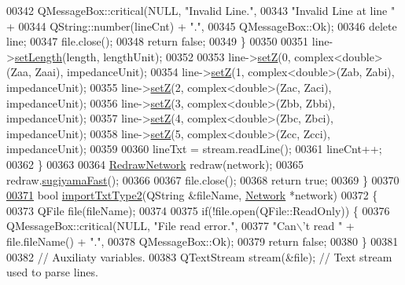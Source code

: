 \begin{DoxyCode}
00342       QMessageBox::critical(NULL, \textcolor{stringliteral}{"Invalid Line."},
00343                             \textcolor{stringliteral}{"Invalid Line at line "} +
00344                             QString::number(lineCnt) + \textcolor{stringliteral}{"."},
00345                             QMessageBox::Ok);
00346       \textcolor{keyword}{delete} line;
00347       file.close();
00348       \textcolor{keywordflow}{return} \textcolor{keyword}{false};
00349     \}
00350 
00351     line->\hyperlink{group___models_ga950d0b8f5d167eda430c65ca7adadbb0}{setLength}(length, lengthUnit);
00352 
00353     line->\hyperlink{group___models_ga2b8fe47ae4ae2d4422d9431e17b4927d}{setZ}(0, complex<double>(Zaa, Zaai), impedanceUnit);
00354     line->\hyperlink{group___models_ga2b8fe47ae4ae2d4422d9431e17b4927d}{setZ}(1, complex<double>(Zab, Zabi), impedanceUnit);
00355     line->\hyperlink{group___models_ga2b8fe47ae4ae2d4422d9431e17b4927d}{setZ}(2, complex<double>(Zac, Zaci), impedanceUnit);
00356     line->\hyperlink{group___models_ga2b8fe47ae4ae2d4422d9431e17b4927d}{setZ}(3, complex<double>(Zbb, Zbbi), impedanceUnit);
00357     line->\hyperlink{group___models_ga2b8fe47ae4ae2d4422d9431e17b4927d}{setZ}(4, complex<double>(Zbc, Zbci), impedanceUnit);
00358     line->\hyperlink{group___models_ga2b8fe47ae4ae2d4422d9431e17b4927d}{setZ}(5, complex<double>(Zcc, Zcci), impedanceUnit);
00359 
00360     lineTxt = stream.readLine();
00361     lineCnt++;
00362   \}
00363 
00364   \hyperlink{class_redraw_network}{RedrawNetwork} redraw(network);
00365   redraw.\hyperlink{group___algorithms_ga94d53ddf8ee00c4ef6d56bb988333103}{sugiyamaFast}();
00366 
00367   file.close();
00368   \textcolor{keywordflow}{return} \textcolor{keyword}{true};
00369 \}
00370 
\hypertarget{import_8cpp_source_l00371}{}\hyperlink{import_8h_aef466de21b145a0fdf215dd1a6409924}{00371} \textcolor{keywordtype}{bool} \hyperlink{import_8cpp_aef466de21b145a0fdf215dd1a6409924}{importTxtType2}(QString &fileName, \hyperlink{class_network}{Network} *network)
00372 \{
00373   QFile file(fileName);
00374 
00375   \textcolor{keywordflow}{if}(!file.open(QFile::ReadOnly)) \{
00376     QMessageBox::critical(NULL, \textcolor{stringliteral}{"File read error."},
00377                           \textcolor{stringliteral}{"Can\(\backslash\)'t read "} + file.fileName() + \textcolor{stringliteral}{"."},
00378                           QMessageBox::Ok);
00379     \textcolor{keywordflow}{return} \textcolor{keyword}{false};
00380   \}
00381 
00382   \textcolor{comment}{// Auxiliaty variables.}
00383   QTextStream stream(&file); \textcolor{comment}{// Text stream used to parse lines.}

\end{DoxyCode}
